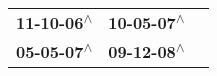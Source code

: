 \begin{supertabular}{lll}
 \textbf{11-10-06\textsuperscript{$\wedge$}} &  \textbf{10-05-07\textsuperscript{$\wedge$}} \\
 \textbf{05-05-07\textsuperscript{$\wedge$}} &  \textbf{09-12-08\textsuperscript{$\wedge$}} \\
\end{supertabular}
